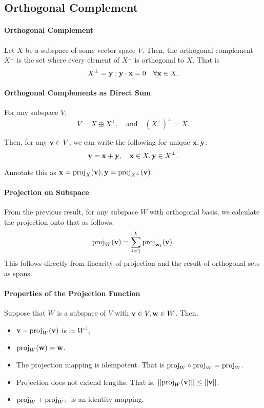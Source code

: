 %
%
%
\subsection{Orthogonal Complement}


\paragraph{Orthogonal Complement}
Let \( X \) be a subspace of some vector space \( V \).
Then, the orthogonal complement \( X^\perp \) is the set where
every element of \( X^\perp \) is orthogonal to \( X \).
That is \[
    X^\perp = {\mathbf{y} : \mathbf{y} \cdot \mathbf{x} = 0 \quad \forall \mathbf{x} \in X}.
\]

\paragraph{Orthogonal Complements as Direct Sum}
For any subspace \( V \), \[
    V = X \oplus X^\perp, \quad\text{and}\quad {\left(X^\perp\right)}^\perp = X.
\]

Then, for any \( \mathbf{v} \in V \), we can write the following for unique
\( \mathbf{x}, \mathbf{y} \): \[
    \mathbf{v} = \mathbf{x} + \mathbf{y}, \quad \mathbf{x} \in X, \mathbf{y} \in X^\perp.
\]

Annotate this as \( \mathbf{x} = \mathrm{proj}_X(\mathbf{v}), \mathbf{y} = \mathrm{proj}_{X^\perp}(\mathbf{v}) \).

\paragraph{Projection on Subspace}
From the previous result, for any subspace \( W \) with orthogonal basis,
we calculate the projection
onto that as follows: \[
    \mathrm{proj}_{W}(\mathbf{v}) = \sum_{i = 1}^{k} \mathrm{proj}_{\mathbf{w}_i}(\mathbf{v}).    
\]
This follows directly from linearity of projection and the result of orthogonal
sets as spans.


\paragraph{Properties of the Projection Function}
Suppose that \( W \) is a subspace of \( V \) with \( \mathbf{v}\in V, \mathbf{w}\in W \).
Then,
\begin{itemize}
    \item \( \mathbf{v} - \mathrm{proj}_{W}(\mathbf{v}) \) is in \( W^\perp \),
    \item \( \mathrm{proj}_W(\mathbf{w}) = \mathbf{w} \).
    \item The projection mapping is idempotent. That is \( \mathrm{proj}_W \circ \mathrm{proj}_W = \mathrm{proj}_W \).
    \item Projection does not extend lengths. That is, \( ||\mathrm{proj}_W(\mathbf{v})|| \leq ||\mathbf{v}|| \).
    \item \( \mathrm{proj}_W + \mathrm{proj}_{W^\perp} \) is an identity mapping.
\end{itemize}

